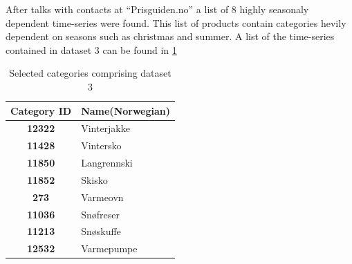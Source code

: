 After talks with contacts at ``Prisguiden.no'' a list of 8 highly seasonaly dependent time-series were found.
This list of products contain categories hevily dependent on seasons such as christmas and summer.
A list of the time-series contained in dataset 3 can be found in \cref{table:dataset3}


\begin{table}[H]
  \centering
  \caption{Selected categories comprising dataset 3}
  \label{table:dataset3}
  \begin{tabular}{|c|l|}\hline
    Category ID & Name(Norwegian)  \\ \hline
    \textbf{12322  } & Vinterjakke      \\ \hline
    \textbf{11428  } & Vintersko      \\ \hline
    \textbf{11850  } & Langrennski      \\ \hline
    \textbf{11852  } & Skisko     \\ \hline
    \textbf{273    } & Varmeovn     \\ \hline
    \textbf{11036  } & Snøfreser     \\ \hline
    \textbf{11213  } & Snøskuffe     \\ \hline
    \textbf{12532  } & Varmepumpe     \\ \hline
  \end{tabular}
\end{table}


